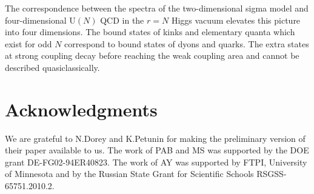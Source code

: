 \documentclass[epsfig,12pt]{article}
\begin{document}
	The correspondence between the spectra of the two-dimensional sigma model and four-dimensional U$(N)$ QCD
	in the $r=N$  Higgs vacuum elevates this picture into four dimensions.
	The bound states of kinks and elementary quanta which exist for odd $ N $ correspond to 
	bound states of dyons and quarks.
	The extra states at strong coupling decay before reaching the weak coupling area and 
	cannot be described quasiclassically.

	

\section*{Acknowledgments}
We are grateful to N.Dorey and K.Petunin for making the preliminary version of their paper \cite{ndkp}
available to us.
The work of PAB and MS was supported by the DOE grant DE-FG02-94ER40823.
The work of AY was  supported
by  FTPI, University of Minnesota
and by the Russian State Grant for
Scientific Schools RSGSS-65751.2010.2.
	
	
\end{document}
